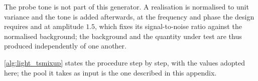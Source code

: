 The probe tone is not part of this generator. A realisation is normalised to unit variance and the tone is added afterwards, at the frequency and phase the design requires and at amplitude $1.5$, which fixes its signal-to-noise ratio against the normalised background; the background and the quantity under test are thus produced independently of one another.

\autoref{alg:light_tsmixup} states the procedure step by step, with the values adopted here; the pool it takes as input is the one described in this appendix.